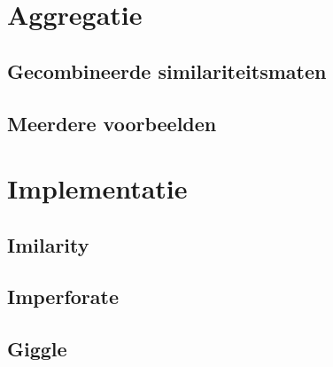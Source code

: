 \documentclass[dutch,11pt,cite,titlepage]{report}
\begin{document}


\newcommand{\auteur}{Klaas Bosteels}
\newcommand{\jaar}{2005--2006}
\newcommand{\titel}{Similariteitsgebaseerd rangschikken van beelden in zoekmachines}
\newcommand{\begeleider}{drs.\ V.\ De Witte en S.\ Schulte}
\newcommand{\richting}{licentiaat in de informatica, optie: software-ontwikkeling}

\newcommand{\vakgroep}{Toegepaste Wiskunde en Informatica}
\newcommand{\voorzitter}{prof.\ dr.\ Guido\ Vanden\ Berghe}
\newcommand{\promotor}{prof.\ dr.\ E.\ E.\ Kerre}


\setcounter{page}{1}
\renewcommand{\baselinestretch}{1}

\tableofcontents %

\newpage

\renewcommand{\baselinestretch}{1}
\setcounter{page}{1}

















\chapter{Aggregatie}

\section{Gecombineerde similariteitsmaten}
\section{Meerdere voorbeelden}


\chapter{Implementatie}

\section{Imilarity}
\section{Imperforate}
\section{Giggle}


\nocite{*}
 

\end{document}
